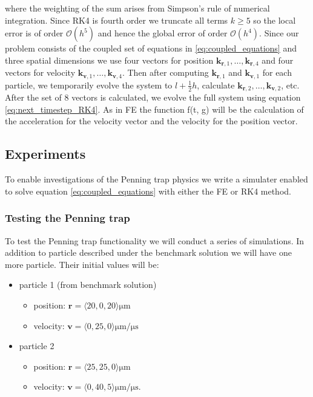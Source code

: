 \documentclass[../main_proj3.tex]{subfiles}
\begin{document}
where the weighting of the sum arises from Simpson's rule of numerical integration. Since RK4 is fourth order we truncate all terms $k\geq 5$ so the local error is of order $\mathcal{O}(h^{5})$ and hence the global error of order $\mathcal{O}(h^{4})$. Since our problem consists of the coupled set of equations in \eqref{eq:coupled_equations} and three spatial dimensions we use four vectors for position $\mathbf{k}_{\mathbf{r}, 1}, \dots, \mathbf{k}_{\mathbf{r}, 4}$ and four vectors for velocity $\mathbf{k}_{\mathbf{v}, 1}, \dots, \mathbf{k}_{\mathbf{v}, 4}$. Then after computing $\mathbf{k}_{\mathbf{r}, 1}$ and $\mathbf{k}_{\mathbf{v}, 1}$ for each particle, we temporarily evolve the system to $l+\frac{1}{2}h$, calculate $\mathbf{k}_{\mathbf{r}, 2}, \dots, \mathbf{k}_{\mathbf{v}, 2}$, etc. After the set of 8 vectors is calculated, we evolve the full system using equation \eqref{eq:next_timestep_RK4}. As in FE the function f(t, g) will be the calculation of the acceleration for the velocity vector and the velocity for the position vector.

\subsection{Experiments}

To enable investigations of the Penning trap physics we write a simulater enabled to solve equation \eqref{eq:coupled_equations} with either the FE or RK4 method.

\subsubsection{Testing the Penning trap}

To test the Penning trap functionality we will conduct a series of simulations. In addition to particle described under the benchmark solution we will have one more particle. Their initial values will be:
\begin{itemize}
    \item particle 1 (from benchmark solution)
    \begin{itemize}
        \item position: $\mathbf{r}= \langle 20, 0, 20 \rangle \mathrm{\mu m}$
        \item velocity: $\mathbf{v}= \langle 0, 25, 0 \rangle \mathrm{\mu m / \mu s}$
    \end{itemize}
    \item particle 2
    \begin{itemize}
        \item position: $\mathbf{r}= \langle 25, 25, 0 \rangle \mathrm{\mu m}$
        \item velocity: $\mathbf{v}= \langle 0, 40, 5 \rangle \mathrm{\mu m / \mu s}$.
    \end{itemize}
\end{itemize}
\end{document}
